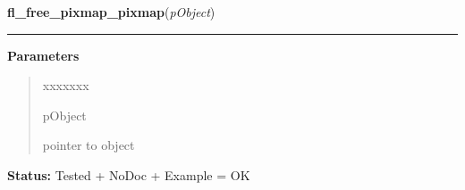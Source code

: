 \hspace{.8\funcindent}\begin{boxedminipage}{\funcwidth}

    \raggedright \textbf{fl\_free\_pixmap\_pixmap}(\textit{pObject})

    \vspace{-1.5ex}

    \rule{\textwidth}{0.5\fboxrule}
\setlength{\parskip}{2ex}
\setlength{\parskip}{1ex}
      \textbf{Parameters}
      \vspace{-1ex}

      \begin{quote}
        \begin{Ventry}{xxxxxxx}

          \item[pObject]

          pointer to object

        \end{Ventry}

      \end{quote}

\textbf{Status:} Tested + NoDoc + Example = OK



    \end{boxedminipage}

    \label{xformslib:library:fl_get_pixmap_pixmap}

    \vspace{0.5ex}

